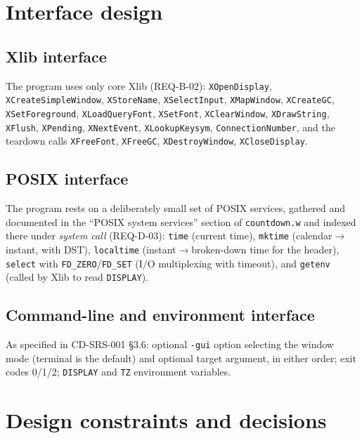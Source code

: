 \documentclass[12pt]{article}
\newcommand{\code}[1]{\texttt{#1}}
\begin{document}
\section{Interface design}

\subsection{Xlib interface}

The program uses only core Xlib (REQ-B-02): \code{XOpenDisplay},
\code{XCreateSimpleWindow}, \code{XStoreName}, \code{XSelectInput},
\code{XMapWindow}, \code{XCreateGC}, \code{XSetForeground},
\code{XLoadQueryFont}, \code{XSetFont}, \code{XClearWindow},
\code{XDrawString}, \code{XFlush}, \code{XPending}, \code{XNextEvent},
\code{XLookupKeysym}, \code{ConnectionNumber}, and the teardown calls
\code{XFreeFont}, \code{XFreeGC}, \code{XDestroyWindow},
\code{XCloseDisplay}.

\subsection{POSIX interface}

The program rests on a deliberately small set of POSIX services, gathered
and documented in the ``POSIX system services'' section of
\code{countdown.w} and indexed there under \emph{system call} (REQ-D-03):
\code{time} (current time), \code{mktime} (calendar$\rightarrow$instant,
with DST), \code{localtime} (instant$\rightarrow$broken-down time for the
header), \code{select} with \code{FD\_ZERO}/\code{FD\_SET} (I/O
multiplexing with timeout), and \code{getenv} (called by Xlib to read
\code{DISPLAY}).

\subsection{Command-line and environment interface}

As specified in CD-SRS-001 \S3.6: optional \code{-gui} option selecting the
window mode (terminal is the default) and optional target argument, in
either order; exit codes 0/1/2; \code{DISPLAY} and \code{TZ} environment
variables.

\section{Design constraints and decisions}
\end{document}
